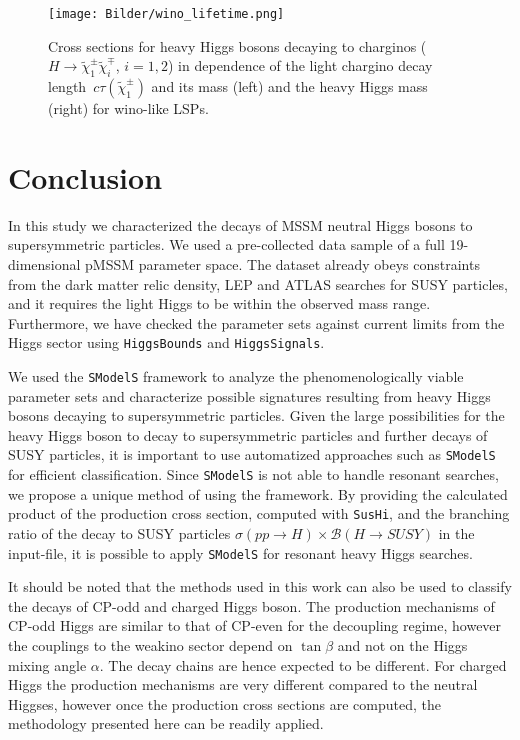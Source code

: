 \documentclass[11pt,a4paper]{article}
\begin{document}
\begin{figure}[h]
\texttt{[image: Bilder/wino\_lifetime.png]}
\caption{Cross sections for heavy Higgs bosons decaying to charginos ($H\rightarrow \tilde{\chi}_1 ^\pm\tilde{\chi}_i ^\mp$, $i=1,2$) in dependence of the light chargino decay length~$c\tau(\tilde{\chi}_1^\pm)$ and its mass (left) and the heavy Higgs mass (right) for wino-like LSPs.}\label{fig_wino}
\end{figure}

\section{Conclusion}
\label{sec:conclusion}
\noindent

In this study we characterized the decays of MSSM neutral Higgs bosons to supersymmetric particles. We used a pre-collected data sample of a full 19-dimensional pMSSM parameter space. The dataset already obeys constraints from the dark matter relic density, LEP and ATLAS searches for SUSY particles, and it requires the light Higgs to be within the observed mass range. Furthermore, we have checked the parameter sets against current limits from the Higgs sector using  \texttt{HiggsBounds} and \texttt{HiggsSignals}.

We used the \texttt{SModelS} framework to analyze the phenomenologically viable parameter sets and characterize possible signatures resulting from heavy Higgs bosons decaying to supersymmetric particles. Given the large possibilities for the heavy Higgs boson to decay to supersymmetric particles and further decays of SUSY particles, it is important to use automatized approaches such as \texttt{SModelS} for efficient classification. Since \texttt{SModelS} is not able to handle resonant searches, we propose a unique method of using the framework. By providing the calculated product of the production cross section, computed with \texttt{SusHi}, and the branching ratio of the decay to SUSY particles $\sigma(pp\rightarrow H)\times\mathcal{B}(H\rightarrow SUSY)$ in the input-file, it is possible to apply \texttt{SModelS} for resonant heavy Higgs searches.

It should be noted that the methods used in this work can also be used to classify the decays of CP-odd and charged Higgs boson. The production mechanisms of CP-odd Higgs are similar to that of CP-even for the decoupling regime, however the couplings to the weakino sector depend on $\tan\beta$ and not on the Higgs mixing angle $\alpha$. The decay chains are hence expected to be different. For charged Higgs the production mechanisms are very different compared to the neutral Higgses, however once the production cross sections are computed, the methodology presented here can be readily applied.
\end{document}
